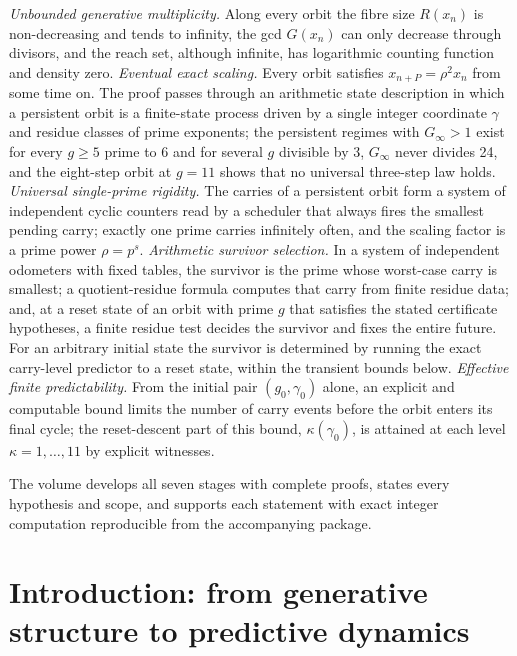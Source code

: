 \emph{Unbounded generative multiplicity.} Along every orbit the fibre size \(R(x_n)\) is non-decreasing and tends to infinity, the gcd \(G(x_n)\) can only decrease through divisors, and the reach set, although infinite, has logarithmic counting function and density zero. \emph{Eventual exact scaling.} Every orbit satisfies \(x_{n+P}=\rho^2x_n\) from some time on. The proof passes through an arithmetic state description in which a persistent orbit is a finite-state process driven by a single integer coordinate \(\gamma\) and residue classes of prime exponents; the persistent regimes with \(G_\infty>1\) exist for every \(g\ge5\) prime to 6 and for several \(g\) divisible by 3, \(G_\infty\) never divides 24, and the eight-step orbit at \(g=11\) shows that no universal three-step law holds. \emph{Universal single-prime rigidity.} The carries of a persistent orbit form a system of independent cyclic counters read by a scheduler that always fires the smallest pending carry; exactly one prime carries infinitely often, and the scaling factor is a prime power \(\rho=p^s\). \emph{Arithmetic survivor selection.} In a system of independent odometers with fixed tables, the survivor is the prime whose worst-case carry is smallest; a quotient-residue formula computes that carry from finite residue data; and, at a reset state of an orbit with prime \(g\) that satisfies the stated certificate hypotheses, a finite residue test decides the survivor and fixes the entire future. For an arbitrary initial state the survivor is determined by running the exact carry-level predictor to a reset state, within the transient bounds below. \emph{Effective finite predictability.} From the initial pair \((g_0,\gamma_0)\) alone, an explicit and computable bound limits the number of carry events before the orbit enters its final cycle; the reset-descent part of this bound, \(\kappa(\gamma_0)\), is attained at each level \(\kappa=1,\dots,11\) by explicit witnesses.

The volume develops all seven stages with complete proofs, states every hypothesis and scope, and supports each statement with exact integer computation reproducible from the accompanying package.

\tableofcontents
\mainmatter

\chapter*{Introduction: from generative structure to predictive dynamics}

